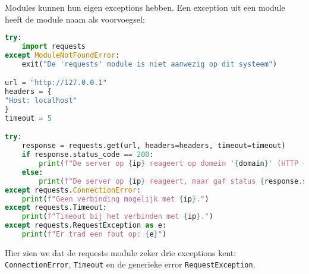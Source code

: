 Modules kunnen hun eigen exceptions hebben. Een exception uit een module heeft de module naam als voorvoegsel:
\begin{lstlisting}[language=python]
try:
    import requests
except ModuleNotFoundError:
    exit("De 'requests' module is niet aanwezig op dit systeem")

url = "http://127.0.0.1"
headers = {
"Host: localhost"
}
timeout = 5

try:
    response = requests.get(url, headers=headers, timeout=timeout)
    if response.status_code == 200:
        print(f"De server op {ip} reageert op domein '{domain}' (HTTP {response.status_code}).")
    else:
        print(f"De server op {ip} reageert, maar gaf status {response.status_code} voor domein '{domain}'.")
except requests.ConnectionError:
    print(f"Geen verbinding mogelijk met {ip}.")
except requests.Timeout:
    print(f"Timeout bij het verbinden met {ip}.")
except requests.RequestException as e:
    print(f"Er trad een fout op: {e}")
\end{lstlisting}
Hier zien we dat de requests module zeker drie exceptions kent: \texttt{ConnectionError}, \texttt{Timeout} en de generieke error \texttt{RequestException}.
